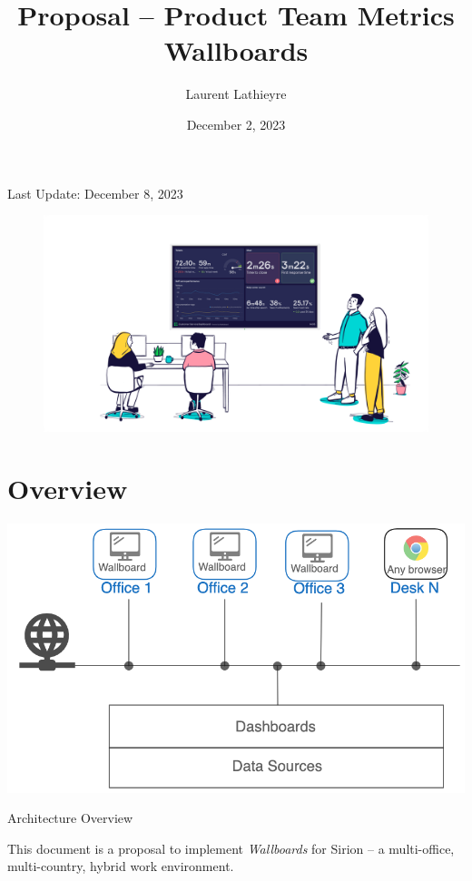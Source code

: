 \documentclass{tufte-handout}
\title{Proposal – Product Team Metrics Wallboards}
\author{Laurent Lathieyre}
\date{December 2, 2023} %
\begin{document}
\maketitle %
Last Update: December 8, 2023

\begin{figure}
    \includegraphics{share-tv.png}
\end{figure}

\section{Overview}\label{sec:overview}
  
\begin{marginfigure}[-80pt]
  \includegraphics{Drawing 2023-12-01 15.06.45.excalidraw}
  \caption{Architecture Overview}
\end{marginfigure}

   This document is a proposal to implement \emph{Wallboards} for Sirion – a multi-office, multi-country, hybrid work environment.
\end{document}
